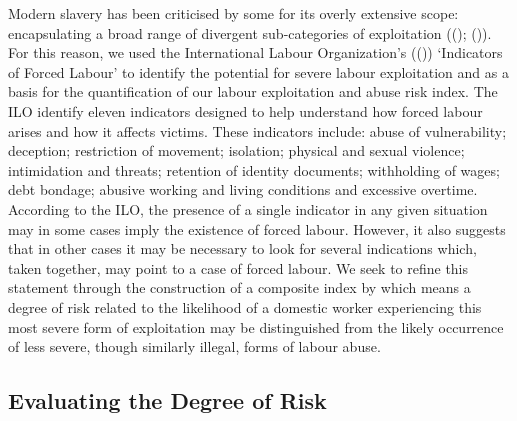 \documentclass[
  12pt,
]{article}
\theoremstyle{plain}
\theoremstyle{definition}
\begin{document}
Modern slavery has been criticised by some for its overly extensive
scope: encapsulating a broad range of divergent sub-categories of
exploitation
(();
()).
For this reason, we used the International Labour Organization's
(()) `Indicators of Forced
Labour' to identify the potential for severe labour exploitation and as
a basis for the quantification of our labour exploitation and abuse risk
index. The ILO identify eleven indicators designed to help understand
how forced labour arises and how it affects victims. These indicators
include: abuse of vulnerability; deception; restriction of movement;
isolation; physical and sexual violence; intimidation and threats;
retention of identity documents; withholding of wages; debt bondage;
abusive working and living conditions and excessive overtime. According
to the ILO, the presence of a single indicator in any given situation
may in some cases imply the existence of forced labour. However, it also
suggests that in other cases it may be necessary to look for several
indications which, taken together, may point to a case of forced labour.
We seek to refine this statement through the construction of a composite
index by which means a degree of risk related to the likelihood of a
domestic worker experiencing this most severe form of exploitation may
be distinguished from the likely occurrence of less severe, though
similarly illegal, forms of labour abuse.

\subsection{Evaluating the Degree of
Risk}\label{evaluating-the-degree-of-risk}
\end{document}
